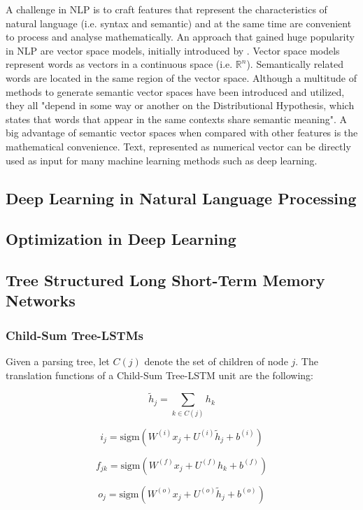 \documentclass[a4paper,12pt]{article}%
\begin{document}
A challenge in NLP is to craft features that represent the characteristics of natural language (i.e. syntax and semantic) and at the same time are convenient to process and analyse mathematically. An approach that gained huge popularity in NLP are vector space models, initially introduced by \citet{Salton1975}. Vector space models represent words as vectors in a continuous space (i.e. $\mathbb{R}^n$). Semantically related words are located in the same region of the vector space. Although a multitude of methods to generate semantic vector spaces have been introduced and utilized, they all "depend in some way or another on the Distributional Hypothesis, which states that words that appear in the same contexts share semantic meaning". A big advantage of semantic vector spaces when compared with other features is the mathematical convenience. Text, represented as numerical vector can be directly used as input for many machine learning methods such as deep learning. 


\subsection{Deep Learning in Natural Language Processing}

\subsection{Optimization in Deep Learning}


\subsection{Tree Structured Long Short-Term Memory Networks}


\subsubsection{Child-Sum Tree-LSTMs}
Given a parsing tree, let $C(j)$ denote the set of children of node $j$. The translation functions of a Child-Sum Tree-LSTM unit are the following:

$$
\tilde{h}_j = \sum_{k \in C(j)} h_k
$$

$$
i_j = \text{sigm} \left( W^{(i)} x_j + U^{(i)} \tilde{h}_j + b^{(i)} \right) 
$$

$$
f_{jk} = \text{sigm} \left( W^{(f)} x_j + U^{(f)} h_k + b^{(f)} \right) 
$$

$$
o_j = \text{sigm} \left( W^{(o)} x_j + U^{(o)} \tilde{h}_j + b^{(o)} \right) 
$$
\end{document}
